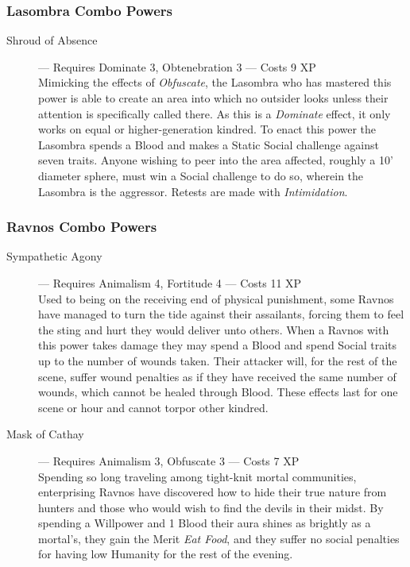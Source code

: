 \subsubsection{Lasombra Combo Powers}
\begin{description}
	\item[Shroud of Absence]--- Requires Dominate 3, Obtenebration 3 --- Costs 9 XP \\
	Mimicking the effects of \emph{Obfuscate}, the Lasombra who has mastered this power is able 
	to create an area into which no outsider looks unless their attention is specifically called 
	there.  As this is a \emph{Dominate} effect, it only works on equal or higher-generation 
	kindred.  To enact this power the Lasombra spends a Blood and makes a Static Social challenge 
	against seven traits.  Anyone wishing to peer into the area affected, roughly a 10' diameter 
	sphere, must win a Social challenge to do so, wherein the Lasombra is the aggressor.  Retests 
	are made with \emph{Intimidation}.
\end{description}

\subsubsection{Ravnos Combo Powers}
\begin{description}
	\item[Sympathetic Agony]--- Requires Animalism 4, Fortitude 4 --- Costs 11 XP \\
	Used to being on the receiving end of physical punishment, some Ravnos have managed to 
	turn the tide against their assailants, forcing them to feel the sting and hurt they 
	would deliver unto others.  When a Ravnos with this power takes damage they may spend a 
	Blood and spend Social traits up to the number of wounds taken.  Their attacker will, 
	for the rest of the scene, suffer wound penalties as if they have received the same 
	number of wounds, which cannot be healed through Blood.  These effects last for one 
	scene or hour and cannot torpor other kindred.
	\item[Mask of Cathay]--- Requires Animalism 3, Obfuscate 3 --- Costs 7 XP \\
	Spending so long traveling among tight-knit mortal communities, enterprising Ravnos have 
	discovered how to hide their true nature from hunters and those who would wish to find 
	the devils in their midst.  By spending a Willpower and 1 Blood their aura shines as brightly 
	as a mortal's, they gain the Merit \emph{Eat Food}, and they suffer no social penalties for 
	having low Humanity for the rest of the evening.
\end{description}

